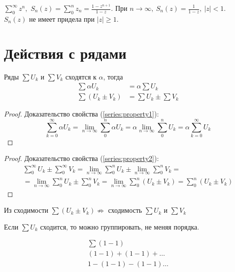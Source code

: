 \begin{example}
  $\sum\limits_0^\infty z^n,$
  $S_n(z) = \sum\limits_0^n z_n = \frac{1-z^{n+1}}{1-z}$.
  При $n \to \infty, \ S_n(z) = \frac{1}{1 - z}, \ |z| < 1$. \\
  $S_n(z)$ не имеет придела при $|z| \geq 1$.
\end{example}

\section{Действия с рядами}

\begin{theorem}
  Ряды $\sum U_k$ и $\sum V_k$ сходятся к $\alpha$, тогда
  \begin{align}
    \label{series:property1}
    \sum\alpha U_k &= \alpha\sum U_k \\
    \label{series:property2}
    \sum (U_k \pm V_k) &= \sum U_k \pm \sum V_k
  \end{align}
\end{theorem}
\begin{proof}
  Доказательство свойства (\ref{series:property1}):
  $$\sum\limits_{k=0}^\infty \alpha U_k = \lim\limits_{n \to \infty}
  \sum\limits_0^n \alpha U_k = \alpha \lim\limits_{n \to \infty} \sum\limits_0^n U_k
  = \alpha \sum\limits_{k = 0}^\infty U_k$$
\end{proof}
\begin{proof}
  Доказательство свойства (\ref{series:property2}):
  \begin{gather*}
      \sum\limits_0^\infty U_k \pm \sum\limits_{0}^{\infty} V_k
      = \lim\limits_{n \to \infty} \sum\limits_{0}^{n} U_k
      \pm \lim\limits_{n \to \infty} \sum\limits_{0}^{n} V_k = \\
      = \lim\limits_{n \to \infty} \sum\limits_{0}^{n} U_k
      \pm \sum\limits_{0}^{n} V_k
      = \lim\limits_{n \to \infty} \sum\limits_{0}^{n} (U_k \pm V_k)
      = \sum\limits_{0}^{n} (U_k \pm V_k)
  \end{gather*}
\end{proof}

\begin{remark}
  Из сходимости $\sum (U_k \pm V_k) \not \Rightarrow$ сходимость
  $\sum U_k$ и $\sum V_k$
\end{remark}
\begin{remark}
  Если $\sum U_k$ сходится, то можно группировать, не меняя порядка.
\end{remark}
\begin{example}
  \begin{gather*}
    \sum (1 - 1) \\
    (1 - 1) + (1 - 1) + \dots \\
    1 - (1 - 1) - (1 - 1) \dots
  \end{gather*}
\end{example}
\begin{comment}
  Нельзя раскрывать скобки и переставлять члены.
\end{comment}
